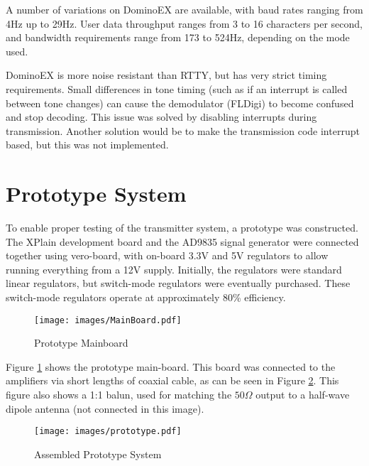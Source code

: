 \documentclass[a4paper,12pt]{article}
\begin{document}
A number of variations on DominoEX are available, with baud rates ranging from 4Hz up to 29Hz. User data throughput ranges from 3 to 16 characters per second, and bandwidth requirements range from 173 to 524Hz, depending on the mode used. 

DominoEX is more noise resistant than RTTY, but has very strict timing requirements. Small differences in tone timing (such as if an interrupt is called between tone changes) can cause the demodulator (FLDigi) to become confused and stop decoding. This issue was solved by disabling interrupts during transmission. Another solution would be to make the transmission code interrupt based, but this was not implemented.



\section{Prototype System}
To enable proper testing of the transmitter system, a prototype was constructed. The XPlain development board and the AD9835 signal generator were connected together using vero-board, with on-board 3.3V and 5V regulators to allow running everything from a 12V supply. Initially, the regulators were standard linear regulators, but switch-mode regulators were eventually purchased. These switch-mode regulators operate at approximately 80\% efficiency.

\begin{figure}[h]
  \begin{center}
    \texttt{[image: images/MainBoard.pdf]}
  \end{center}
  \caption{Prototype Mainboard}
  \label{fig:mainboard}
\end{figure}

Figure \ref{fig:mainboard} shows the prototype main-board. This board was connected to the amplifiers via short lengths of coaxial cable, as can be seen in Figure \ref{fig:prototype}. This figure also shows a 1:1 balun, used for matching the $50\Omega$ output to a half-wave dipole antenna (not connected in this image).

\begin{figure}[h]
  \begin{center}
    \texttt{[image: images/prototype.pdf]}
  \end{center}
  \caption{Assembled Prototype System}
  \label{fig:prototype}
\end{figure}
\end{document}
